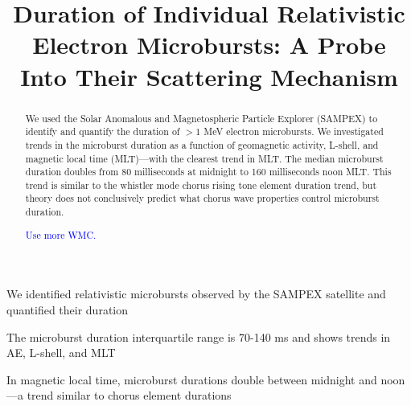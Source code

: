 \documentclass[draft]{agujournal2019}
\begin{document}
%
%



\title{Duration of Individual Relativistic Electron Microbursts: A Probe Into Their Scattering Mechanism}






\begin{keypoints}
\item We identified relativistic microbursts observed by the SAMPEX satellite and quantified their duration
\item The microburst duration interquartile range is 70-140 ms and shows trends in AE, L-shell, and MLT
\item In magnetic local time, microburst durations double between midnight and noon---a trend similar to chorus element durations
\end{keypoints}

\begin{abstract}
We used the Solar Anomalous and Magnetospheric Particle Explorer (SAMPEX) to identify and quantify the duration of $>1$ MeV electron microbursts. We investigated trends in the microburst duration as a function of geomagnetic activity, L-shell, and magnetic local time (MLT)---with the clearest trend in MLT. The median microburst duration doubles from 80 milliseconds at midnight to 160 milliseconds noon MLT. This trend is similar to the whistler mode chorus rising tone element duration trend, but theory does not conclusively predict what chorus wave properties control microburst duration.

\textcolor{blue}{Use more WMC.}
\end{abstract}
\end{document}
